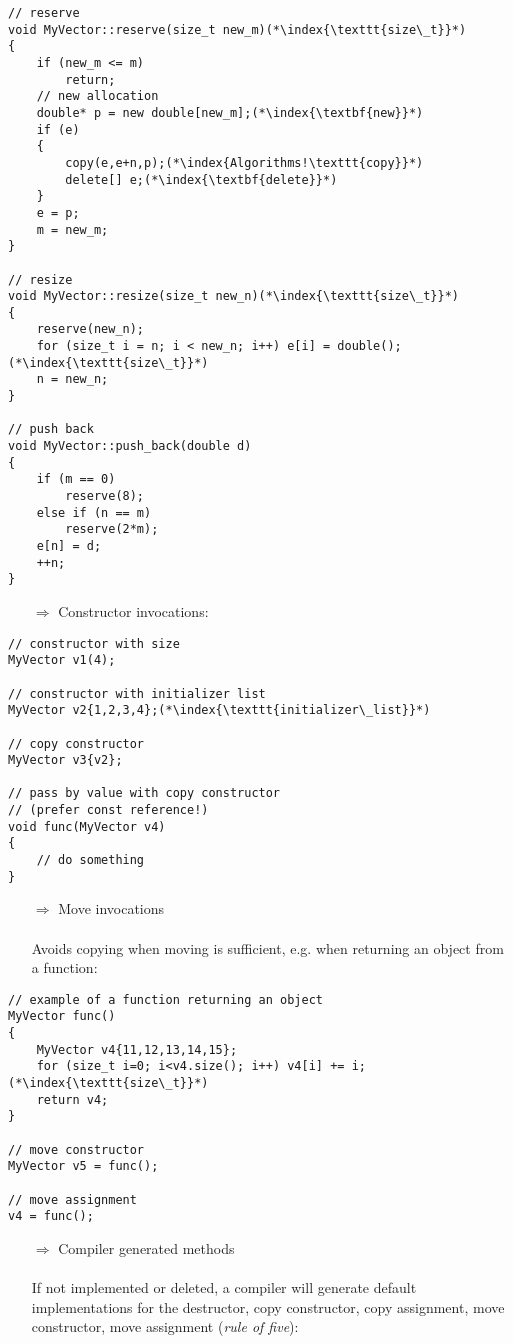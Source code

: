 \documentclass[10pt]{article}
\begin{document}
\begin{lstlisting}
// reserve
void MyVector::reserve(size_t new_m)(*\index{\texttt{size\_t}}*)
{
    if (new_m <= m)
        return;
    // new allocation
    double* p = new double[new_m];(*\index{\textbf{new}}*)
    if (e)
    {
        copy(e,e+n,p);(*\index{Algorithms!\texttt{copy}}*)
        delete[] e;(*\index{\textbf{delete}}*)
    }
    e = p;
    m = new_m;
}

// resize
void MyVector::resize(size_t new_n)(*\index{\texttt{size\_t}}*)
{
    reserve(new_n);
    for (size_t i = n; i < new_n; i++) e[i] = double();(*\index{\texttt{size\_t}}*)
    n = new_n;
}

// push back
void MyVector::push_back(double d)
{
    if (m == 0)
        reserve(8);
    else if (n == m)
        reserve(2*m);
    e[n] = d;
    ++n;
}
\end{lstlisting}
\begin{enumerate}
\item[$\Rightarrow$] Constructor invocations:
\end{enumerate}
\begin{lstlisting}
// constructor with size
MyVector v1(4); 

// constructor with initializer list
MyVector v2{1,2,3,4};(*\index{\texttt{initializer\_list}}*)

// copy constructor
MyVector v3{v2}; 

// pass by value with copy constructor
// (prefer const reference!)
void func(MyVector v4)
{
    // do something
}
\end{lstlisting}
\begin{enumerate}
\item[$\Rightarrow$] Move invocations\\ \\ Avoids copying when moving is sufficient, e.g. when returning an object from a function:
\end{enumerate}
\begin{lstlisting}
// example of a function returning an object
MyVector func()
{
    MyVector v4{11,12,13,14,15};
    for (size_t i=0; i<v4.size(); i++) v4[i] += i;(*\index{\texttt{size\_t}}*)
    return v4;
}

// move constructor
MyVector v5 = func(); 

// move assignment
v4 = func();       
\end{lstlisting}
\begin{enumerate}
\item[$\Rightarrow$] Compiler generated methods \\ \\ If not implemented or deleted, a compiler will generate default implementations for the destructor, copy constructor, copy assignment, move constructor, move assignment (\emph{rule of five}):
\end{enumerate}
\end{document}
